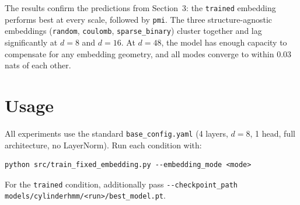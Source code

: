 \documentclass[11pt]{article}
\begin{document}
The results confirm the predictions from Section~3:
the \texttt{trained} embedding performs best at every scale, followed
by \texttt{pmi}.  The three structure-agnostic embeddings
(\texttt{random}, \texttt{coulomb}, \texttt{sparse\_binary}) cluster
together and lag significantly at $d{=}8$ and $d{=}16$.  At $d{=}48$,
the model has enough capacity to compensate for any embedding geometry,
and all modes converge to within $0.03$\,nats of each other.

\section{Usage}

All experiments use the standard \texttt{base\_config.yaml} (4 layers,
$d = 8$, 1 head, full architecture, no LayerNorm).  Run each condition
with:

\begin{verbatim}
python src/train_fixed_embedding.py --embedding_mode <mode>
\end{verbatim}

For the \texttt{trained} condition, additionally pass
\texttt{-{}-checkpoint\_path models/cylinderhmm/<run>/best\_model.pt}.
\end{document}
